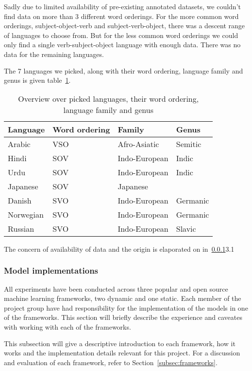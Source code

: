 Sadly due to limited availability of pre-existing annotated datasets, we
couldn't find data on more than 3 different word orderings. For the more common
word orderings, subject-object-verb and subject-verb-object, there was a descent
range of languages to choose from. But for the less common word orderings we
could only find a single verb-subject-object language with enough data. There
was no data for the remaining languages. 

The 7 languages we picked, along with their word ordering, language family and
genus is given table~\ref{table:langfam}.

\begin{table}[!ht]
  \centering
  \begin{tabular}{llll}
    \textbf{Language} & \textbf{Word ordering} & \textbf{Family} & \textbf{Genus} \\
    \midrule
    Arabic    & VSO & Afro-Asiatic  & Semitic \\
    Hindi     & SOV & Indo-European & Indic \\
    Urdu      & SOV & Indo-European & Indic \\
    Japanese  & SOV & Japanese      & \\
    Danish    & SVO & Indo-European & Germanic \\
    Norwegian & SVO & Indo-European & Germanic \\
    Russian   & SVO & Indo-European & Slavic \\
  \end{tabular}
  \caption{Overview over picked languages, their word ordering, language
  family and genus}
  \label{table:langfam}
\end{table}

The concern of availability of data and the origin is elaporated on
in~\ref{}{3.1}


\subsubsection{Model implementations}

All experiments have been conducted across three popular and open source machine
learning frameworks, two dynamic and one static. Each member of the project
group have had responsibility for the implementation of the models in one of the
frameworks. This section will briefly describe the experience and caveates with
working with each of the frameworks.

This subsection will give a descriptive introduction to each framework, how it
works and the implementation details relevant for this project. For a discussion
and evaluation of each framework, refer to Section~\ref{subsec:frameworks}.

